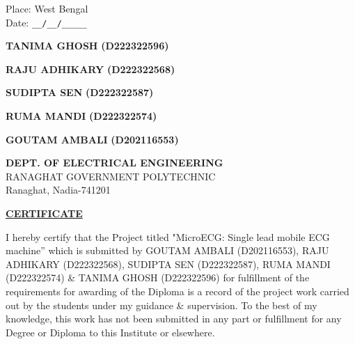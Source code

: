 \documentclass[12pt,a4paper]{report}
\begin{document}
\noindent \begin{minipage}{3.6cm}
\begin{flushleft}
\vspace{5 cm}
                         
Place: West Bengal\\
Date: \verb|__/__/_____| \\

\end{flushleft} 
\end{minipage}
\hfill
\begin{minipage}{13.6cm}
\begin{flushright}                                      
\vspace{5 cm}
\begin{multicols}{3}
\textbf{TANIMA GHOSH}
\textbf{(D222322596)}\\
\vspace{1cm}

\textbf{RAJU ADHIKARY}
\textbf{(D222322568)}\\
\vspace{1cm}

\textbf{SUDIPTA SEN}
\textbf{(D222322587)}\\
\vspace{1cm}

\textbf{RUMA MANDI}
\textbf{(D222322574)}\\
\vspace{1cm}

\textbf{GOUTAM AMBALI}
\textbf{(D202116553)}\\
\vspace{1cm}
\end{multicols}


\end{flushright} 
\end{minipage}

\thispagestyle{empty}

\newpage


\begin{center}
\textbf{DEPT. OF ELECTRICAL ENGINEERING}\\

RANAGHAT GOVERNMENT POLYTECHNIC \\

Ranaghat, Nadia-741201\\
\end{center}

\vspace{2cm}
\begin{center}
 \textbf{\underline {CERTIFICATE}}
\end{center}
\sloppy I hereby certify that the Project titled "MicroECG: Single lead mobile ECG machine” which is submitted by GOUTAM AMBALI (D202116553), RAJU ADHIKARY (D222322568), SUDIPTA SEN (D222322587), RUMA MANDI (D222322574) \& TANIMA GHOSH (D222322596) for fulfillment of the requirements for awarding of the Diploma is a record of the project work carried out by the students under my guidance \& supervision. To the best of my knowledge, this work has not been submitted in any part or fulfillment for any Degree or Diploma to this Institute or elsewhere.
\end{document}
